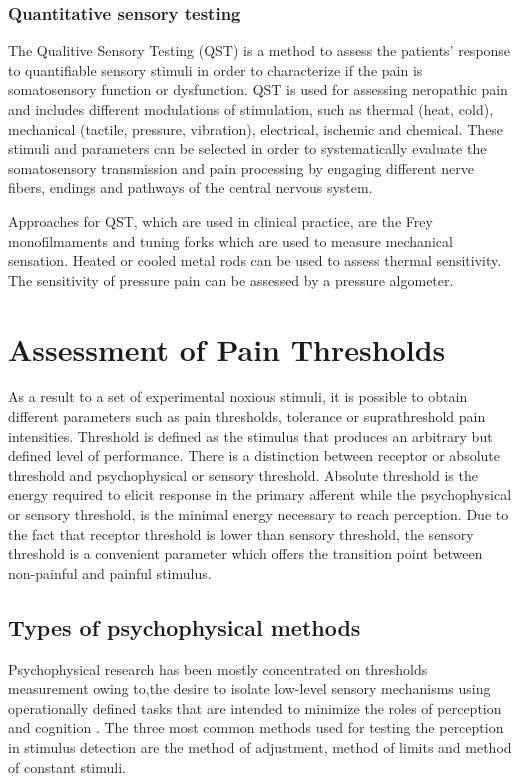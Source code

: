 \subsubsection{Quantitative sensory testing}
The Qualitive Sensory Testing (QST) is a method to assess the patients' response to quantifiable sensory stimuli in order to characterize if the pain is somatosensory function or dysfunction. QST is used for assessing neropathic pain and includes different modulations of stimulation, such as thermal (heat, cold), mechanical (tactile, pressure, vibration), electrical, ischemic and chemical. These stimuli and parameters can be selected in order to systematically evaluate the somatosensory transmission and pain processing by engaging different nerve fibers, endings and pathways of the central nervous system. \cite{Fillingim2016} 

Approaches for QST, which are used in clinical practice, are the Frey monofilmaments and tuning forks which are used to measure mechanical sensation. Heated or cooled metal rods can be used to assess thermal sensitivity. The sensitivity of pressure pain can be assessed by a pressure algometer. \cite{Fillingim2016}


\section{Assessment of Pain Thresholds}
As a result to a set of experimental noxious stimuli, it is possible to obtain different parameters such as pain thresholds, tolerance or suprathreshold pain intensities. Threshold is defined as the stimulus that produces an arbitrary but defined level of performance. There is a distinction between receptor or absolute threshold and psychophysical or sensory threshold. Absolute threshold is the energy required to elicit response in the primary afferent while the psychophysical or sensory threshold, is the minimal energy necessary to reach perception. Due to the fact that receptor threshold is lower than sensory threshold, the sensory threshold is a convenient parameter which offers the transition point between non-painful and painful stimulus. \cite{Yarnitsky2006}


\subsection{Types of psychophysical methods}
Psychophysical research has been mostly concentrated on thresholds measurement owing to,the desire to isolate low-level sensory mechanisms using operationally defined tasks that are intended to minimize the roles of perception and cognition \cite{Pelli2010}. The three most common methods used for testing the perception in stimulus detection are the method of adjustment, method of limits and method of constant stimuli.

